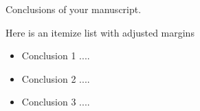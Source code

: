 Conclusions of your manuscript.

Here is an itemize list with adjusted margins
\begin{itemize}[leftmargin=0.5em, itemsep=1em]
    \item Conclusion 1 ....
    \item Conclusion 2 ....
    \item Conclusion 3 ....
\end{itemize}
